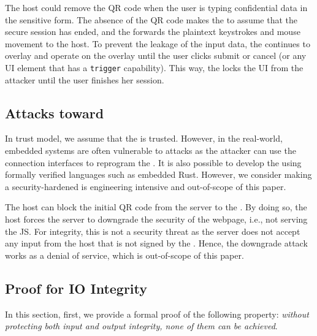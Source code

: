  The host could remove the QR code when the user is typing confidential data in the sensitive form. The absence of the QR code makes the \device to assume that the secure session has ended, and the \device forwards the plaintext keystrokes and mouse movement to the host. To prevent the leakage of the input data, the \device continues to overlay and operate on the overlay until the user clicks submit or cancel (or any UI element that has a \texttt{trigger}  capability). This way, the \device locks the UI from the attacker until the user finishes her session.

\subsection{Attacks toward \device} 
\label{sec:securityAnalysis:device}

In \name trust model, we assume that the \device is trusted. However, in the real-world, embedded systems are often vulnerable to attacks as the attacker can use the connection interfaces to reprogram the \device. It is also possible to develop the \device using formally verified languages such as embedded Rust. However, we consider making a security-hardened \device is engineering intensive and out-of-scope of this paper. 


 The host can block the initial QR code from the server to the \device. By doing so, the host forces the server to downgrade the security of the webpage, i.e., not serving the \name JS. For integrity, this is not a security threat as the server does not accept any input from the host that is not signed by the \device. Hence, the downgrade attack works as a denial of service, which is out-of-scope of this paper.


\subsection{Proof for IO Integrity}
\label{sec:securityAnalysis:proof}

In this section, first, we provide a formal proof of the following property: \emph{without protecting both input and output integrity, none of them can be achieved}. 


